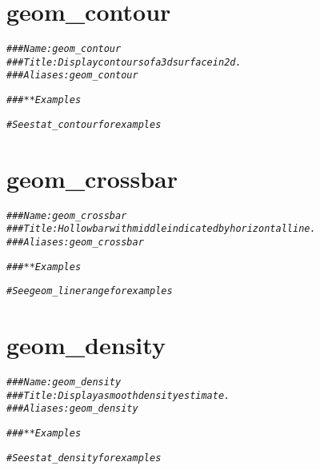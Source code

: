 \documentclass[a4paper,titlepage]{tufte-handout}\usepackage[]{graphicx}\usepackage[]{color}
\makeatletter
\newcommand{\hlcom}[1]{\textcolor[rgb]{0.678,0.584,0.686}{\textit{#1}}}%
\newenvironment{kframe}{%
 \def\at@end@of@kframe{}%
 \ifinner\ifhmode%
  \def\at@end@of@kframe{\end{minipage}}%
  \begin{minipage}{\columnwidth}%
 \fi\fi%
 \def\FrameCommand##1{\hskip\@totalleftmargin \hskip-\fboxsep
 \colorbox{shadecolor}{##1}\hskip-\fboxsep
     \hskip-\linewidth \hskip-\@totalleftmargin \hskip\columnwidth}%
 \MakeFramed {\advance\hsize-\width
   \@totalleftmargin\z@ \linewidth\hsize
   \@setminipage}}%
 {\par\unskip\endMakeFramed%
 \at@end@of@kframe}
\newenvironment{knitrout}{}{} %
\makeatother
\begin{document}
\section{geom\_contour}

\begin{knitrout}
\color{fgcolor}\begin{kframe}
\begin{alltt}
\hlcom{### Name: geom_contour}
\hlcom{### Title: Display contours of a 3d surface in 2d.}
\hlcom{### Aliases: geom_contour}

\hlcom{### ** Examples}

\hlcom{# See stat_contour for examples}
\end{alltt}
\end{kframe}
\end{knitrout}



\section{geom\_crossbar}

\begin{knitrout}
\color{fgcolor}\begin{kframe}
\begin{alltt}
\hlcom{### Name: geom_crossbar}
\hlcom{### Title: Hollow bar with middle indicated by horizontal line.}
\hlcom{### Aliases: geom_crossbar}

\hlcom{### ** Examples}

\hlcom{# See geom_linerange for examples}
\end{alltt}
\end{kframe}
\end{knitrout}



\section{geom\_density}

\begin{knitrout}
\color{fgcolor}\begin{kframe}
\begin{alltt}
\hlcom{### Name: geom_density}
\hlcom{### Title: Display a smooth density estimate.}
\hlcom{### Aliases: geom_density}

\hlcom{### ** Examples}

\hlcom{# See stat_density for examples}
\end{alltt}
\end{kframe}
\end{knitrout}
\end{document}
